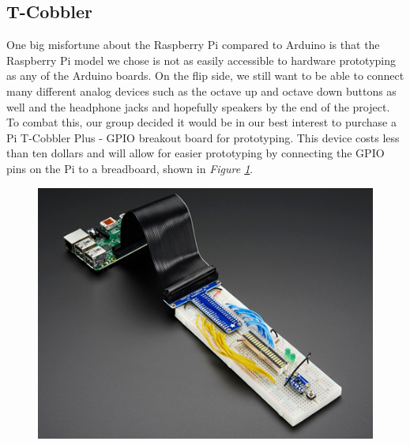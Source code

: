 \subsection{T-Cobbler}

One big misfortune about the Raspberry Pi compared to Arduino is that the Raspberry Pi model we chose is not as easily accessible to hardware prototyping as any of the Arduino boards. On the flip side, we still want to be able to connect many different analog devices such as the octave up and octave down buttons as well and the headphone jacks and hopefully speakers by the end of the project. To combat this, our group decided it would be in our best interest to purchase a Pi T-Cobbler Plus - GPIO breakout board for prototyping. This device costs less than ten dollars and will allow for easier prototyping by connecting the GPIO pins on the Pi to a breadboard, shown in \textit{Figure \ref{fig:tcobbler}}.

\begin{figure}[h!]
  \centering
  \includegraphics[width=\linewidth]{image/TCobbler.png}
  \caption{}
  \label{fig:tcobbler}
\end{figure}
